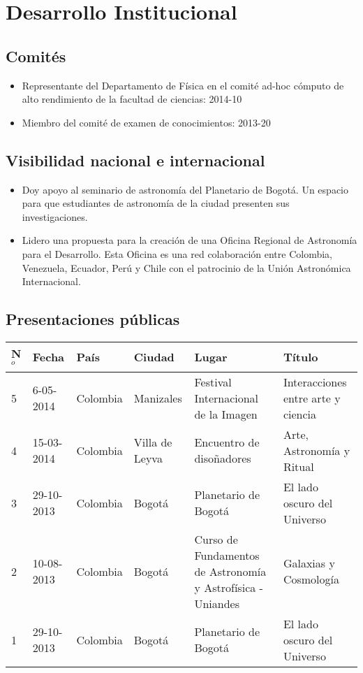 \documentclass{article}
\begin{document}
\section{Desarrollo Institucional}

\subsection{Comit\'es}
\begin{itemize}
\item {Representante del Departamento de F\'isica en el comit\'e
  ad-hoc c\'omputo de alto rendimiento de la facultad de ciencias}:
  2014-10  
\item {Miembro del comit\'e de examen de conocimientos}: 2013-20 
\end{itemize}


\subsection{Visibilidad nacional e internacional}
\begin{itemize}
\item {Doy apoyo al seminario de astronom\'ia del Planetario de
  Bogot\'a. Un espacio para que estudiantes de astronom\'ia de la
  ciudad presenten sus investigaciones.}  
\item {Lidero una propuesta para la creaci\'on de una Oficina Regional
  de Astronom\'ia para el Desarrollo. Esta Oficina es una red
  colaboraci\'on entre Colombia, Venezuela, Ecuador, Per\'u y Chile
  con el patrocinio de la Uni\'on Astron\'omica Internacional.}  
\end{itemize}

\subsection{Presentaciones p\'ublicas}

\begin{tabular}{l l l l p{3cm} p{4cm}}\hline
N$^{o}$ & Fecha & Pa\'is & Ciudad & Lugar & T\'itulo\\\hline
5 & 6-05-2014 & Colombia & Manizales & Festival Internacional de la
Imagen & Interacciones entre arte y ciencia\\ \hline
4 & 15-03-2014  & Colombia & Villa de Leyva & Encuentro de
diso\~nadores & Arte, Astronomía y Ritual \\ \hline
3 & 29-10-2013 & Colombia & Bogot\'a & Planetario de Bogot\'a & El
lado oscuro del Universo\\ \hline 
2 & 10-08-2013 & Colombia & Bogot\'a & Curso de Fundamentos de
Astronom\'ia y Astrof\'isica - Uniandes & Galaxias y
Cosmolog\'ia\\    \hline
1 & 29-10-2013 & Colombia & Bogot\'a & Planetario de Bogot\'a & El
lado oscuro del Universo\\ \hline 
\end{tabular}
\end{document}
